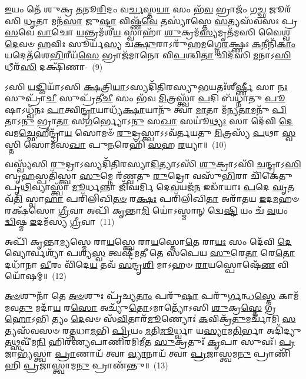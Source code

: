\-\ul{𑌇}\-𑌯𑌂 𑌤𑍇᳴ 𑌶𑍁𑌕𑍍𑌰 \ul{𑌤}\-𑌨𑍂\-\ul{𑌰𑌿}\-𑌦𑌂 𑌵\-\ul{𑌰𑍍𑌚}\-𑌸𑍍𑌤\-\ul{𑌯𑌾} 𑌸𑌂 𑌭᳴\-\ul{𑌵} 𑌭𑍍𑌰𑌾𑌜𑌂᳴ 𑌗\-\ul{𑌚𑍍𑌛} 𑌜𑍂𑌰᳴𑌸𑌿 \ul{𑌧𑍃}\-𑌤𑌾 𑌮𑌨᳴\-\ul{𑌸𑌾} 𑌜𑍁\-\ul{𑌷𑍍𑌟𑌾} 𑌵𑌿𑌷𑍍𑌣᳴\-\ul{𑌵𑍇} 𑌤𑌸𑍍𑌯𑌾॑𑌸𑍍𑌤𑍇 \ul{𑌸}\-𑌤𑍍𑌯𑌸᳴𑌵𑌸𑌃 𑌪𑍍𑌰\-\ul{𑌸}\-𑌵𑍇 \ul{𑌵𑌾}\-𑌚𑍋 \ul{𑌯}\-𑌨𑍍𑌤𑍍𑌰𑌮᳴𑌶𑍀\-\ul{𑌯} 𑌸𑍍𑌵𑌾𑌹𑌾᳴ \ul{𑌶𑍁}\-𑌕𑍍𑌰𑌮᳴\-\ul{𑌸𑍍𑌯}\-𑌮𑍃𑌤᳴𑌮𑌸𑌿 𑌵𑍈𑌶𑍍𑌵\-\ul{𑌦𑍇}\-𑌵𑍞 \ul{𑌹}\-𑌵𑌿𑌃 𑌸𑍂𑌰𑍍𑌯᳴\-\ul{𑌸𑍍𑌯} 𑌚\-\ul{𑌕𑍍𑌷𑍁}\-𑌰𑌾\-𑌽𑌰𑍁᳴𑌹\-\ul{𑌮}\-𑌗𑍍𑌨𑍇\-\ul{𑌰}\-𑌕𑍍𑌷𑍍𑌣𑌃 \ul{𑌕}\-𑌨𑍀𑌨𑌿᳴\-\ul{𑌕𑌾𑌂} 𑌯𑌦𑍇𑌤᳴𑌶𑍇\-\ul{𑌭𑌿}\-𑌰𑍀𑌯᳴\-\ul{𑌸𑍇} 𑌭𑍍𑌰𑌾𑌜᳴𑌮𑌾𑌨𑍋 𑌵𑌿\-\ul{𑌪}\-𑌶𑍍𑌚𑌿\-\ul{𑌤𑌾} 𑌚𑌿𑌦᳴𑌸𑌿 \ul{𑌮}\-𑌨𑌾\-𑌽\-\ul{𑌸𑌿} 𑌧𑍀𑌰᳴\-\ul{𑌸𑌿} 𑌦𑌕𑍍𑌷𑌿᳴𑌣𑌾-~(9)

𑌽𑌸𑌿 \ul{𑌯}\-𑌜𑍍𑌞𑌿𑌯𑌾᳴\-𑌽𑌸𑌿 \ul{𑌕𑍍𑌷}\-𑌤𑍍𑌰𑌿\-\ul{𑌯𑌾}\-\-𑌽𑌸𑍍𑌯𑌦𑌿᳴𑌤𑌿𑌰𑌸𑍍𑌯𑍁\-\ul{𑌭}\-𑌯𑌤𑌃᳴𑌶𑍀\-\ul{𑌰𑍍𑌷𑍍𑌣𑍀} 𑌸𑌾 \ul{𑌨𑌃} 𑌸𑍁𑌪𑍍𑌰𑌾᳴\-\ul{𑌚𑍀} 𑌸𑍁𑌪𑍍𑌰᳴𑌤𑍀\-\ul{𑌚𑍀} 𑌸𑌂 𑌭᳴𑌵 \ul{𑌮𑌿}\-𑌤𑍍𑌰𑌸𑍍𑌤𑍍𑌵𑌾᳴ \ul{𑌪}\-𑌦𑌿 𑌬᳴𑌧𑍍𑌨𑌾𑌤𑍁 \ul{𑌪𑍂}\-𑌷𑌾\-𑌽𑌧𑍍𑌵᳴𑌨𑌃 \ul{𑌪𑌾}\-𑌤𑍍𑌵𑌿\-\ul{𑌨𑍍𑌦𑍍𑌰𑌾}\-𑌯𑌾𑌧𑍍𑌯᳴\-\ul{𑌕𑍍𑌷𑌾}\-𑌯𑌾𑌨𑍁᳴ 𑌤𑍍𑌵𑌾 \ul{𑌮𑌾}\-𑌤𑌾 𑌮᳴𑌨𑍍𑌯\-\ul{𑌤𑌾}\-𑌮𑌨𑍁᳴ \ul{𑌪𑌿}\-𑌤𑌾\-𑌽\-\ul{𑌨𑍁} 𑌭𑍍𑌰𑌾\-\ul{𑌤𑌾} 𑌸\-\ul{𑌗}\-𑌰𑍍𑌭𑍍𑌯𑍋\-𑌽\-\ul{𑌨𑍁} 𑌸\-\ul{𑌖𑌾} 𑌸𑌯𑍂॑\-\ul{𑌥𑍍𑌯𑌃} 𑌸𑌾 𑌦𑍇᳴𑌵𑌿 \ul{𑌦𑍇}\-𑌵𑌮\-\ul{𑌚𑍍𑌛𑍇}\-𑌹𑍀𑌨𑍍𑌦𑍍𑌰𑌾᳴\-\ul{𑌯} 𑌸𑍋𑌮𑍞᳴ \ul{𑌰𑍁}\-𑌦𑍍𑌰𑌸𑍍𑌤𑍍𑌵𑌾\-𑌽\-𑌽𑌵᳴𑌰𑍍𑌤𑌯𑌤𑍁 \ul{𑌮𑌿}\-𑌤𑍍𑌰𑌸𑍍𑌯᳴ \ul{𑌪}\-𑌥𑌾 \ul{𑌸𑍍𑌵}\-𑌸𑍍𑌤𑌿 𑌸𑍋𑌮᳴𑌸\-\ul{𑌖𑌾} 𑌪𑍁\-\ul{𑌨}\-𑌰𑍇𑌹𑌿᳴ \ul{𑌸}\-𑌹 \ul{𑌰}\-𑌯𑍍𑌯𑌾॥~(10)

{\anuvakamend[{𑌦𑌕𑍍𑌷𑌿᳴\-\ul{𑌣𑌾} 𑌸𑍋𑌮᳴𑌸\-\ul{𑌖𑌾} 𑌪𑌞𑍍𑌚᳴ 𑌚}]}%

𑌵𑌸𑍍𑌵𑍍𑌯᳴𑌸𑌿 \ul{𑌰𑍁}\-𑌦𑍍𑌰𑌾\-𑌽𑌸𑍍𑌯𑌦𑌿᳴𑌤𑌿𑌰𑌸𑍍𑌯𑌾\-\ul{𑌦𑌿}\-𑌤𑍍𑌯𑌾\-𑌽𑌸𑌿᳴ \ul{𑌶𑍁}\-𑌕𑍍𑌰𑌾\-𑌽𑌸𑌿᳴ \ul{𑌚}\-𑌨𑍍𑌦𑍍𑌰𑌾\-𑌽\-\ul{𑌸𑌿} 𑌬𑍃\-\ul{𑌹}\-𑌸𑍍𑌪𑌤𑌿᳴𑌸𑍍𑌤𑍍𑌵𑌾 \ul{𑌸𑍁}\-𑌮𑍍𑌨𑍇 𑌰᳴𑌣𑍍𑌵𑌤𑍁 \ul{𑌰𑍁}\-𑌦𑍍𑌰𑍋 𑌵𑌸𑍁᳴\-\ul{𑌭𑌿}\-𑌰𑌾 𑌚𑌿᳴𑌕𑍇𑌤𑍁 𑌪𑍃\-\ul{𑌥𑌿}\-𑌵𑍍𑌯𑌾𑌸𑍍𑌤𑍍𑌵𑌾᳴ \ul{𑌮𑍂}\-𑌰𑍍𑌧𑌨𑍍𑌨𑌾 𑌜𑌿᳴𑌘𑌰𑍍𑌮𑌿 𑌦𑍇\-\ul{𑌵}\-𑌯𑌜᳴\-\ul{𑌨} 𑌇𑌡𑌾᳴𑌯𑌾𑌃 \ul{𑌪}\-𑌦𑍇 \ul{𑌘𑍃}\-𑌤𑌵᳴\-\ul{𑌤𑌿} 𑌸𑍍𑌵𑌾\-\ul{𑌹𑌾} 𑌪𑌰𑌿᳴𑌲𑌿𑌖𑌿\-\ul{𑌤}\-\-\ul{𑍞} 𑌰\-\ul{𑌕𑍍𑌷𑌃} 𑌪𑌰𑌿᳴𑌲𑌿𑌖𑌿\-\ul{𑌤𑌾} 𑌅𑌰𑌾᳴𑌤𑌯 \ul{𑌇}\-𑌦\-\ul{𑌮}\-𑌹𑍞 𑌰𑌕𑍍𑌷᳴𑌸𑍋 \ul{𑌗𑍍𑌰𑍀}\-𑌵𑌾 𑌅𑌪𑌿᳴ 𑌕𑍃𑌨𑍍𑌤𑌾\-\ul{𑌮𑌿} 𑌯𑍋॑\-𑌽𑌸𑍍𑌮𑌾𑌨𑍍 𑌦𑍍𑌵𑍇\-\ul{𑌷𑍍𑌟𑌿} 𑌯𑌂 𑌚᳴ \ul{𑌵}\-𑌯𑌂 \ul{𑌦𑍍𑌵𑌿}\-𑌷𑍍𑌮 \ul{𑌇}\-𑌦𑌮᳴𑌸𑍍𑌯 \ul{𑌗𑍍𑌰𑍀}\-𑌵𑌾~(11)

𑌅𑌪𑌿᳴ 𑌕𑍃𑌨𑍍𑌤𑌾\-\ul{𑌮𑍍𑌯}\-𑌸𑍍𑌮𑍇 𑌰𑌾\-\ul{𑌯}\-𑌸𑍍𑌤𑍍𑌵𑍇 𑌰𑌾\-\ul{𑌯}\-𑌸𑍍𑌤𑍋\-\ul{𑌤𑍇} 𑌰𑌾\-\ul{𑌯𑌃} 𑌸𑌂 𑌦𑍇᳴𑌵𑌿 \ul{𑌦𑍇}\-𑌵𑍍𑌯𑍋𑌰𑍍𑌵𑌶𑍍𑌯𑌾᳴ 𑌪𑌶𑍍𑌯\-\ul{𑌸𑍍𑌵} 𑌤𑍍𑌵𑌷𑍍𑌟𑍀᳴𑌮𑌤𑍀 𑌤𑍇 𑌸𑌪𑍇𑌯 \ul{𑌸𑍁}\-𑌰𑍇\-\ul{𑌤𑌾} 𑌰𑍇\-\ul{𑌤𑍋} 𑌦𑌧𑌾᳴𑌨𑌾 \ul{𑌵𑍀}\-𑌰𑌂 𑌵𑌿᳴𑌦𑍇\-\ul{𑌯} 𑌤𑌵᳴ \ul{𑌸}\-𑌨𑍍𑌦𑍃\-\ul{𑌶𑌿} 𑌮𑌾\-𑌽𑌹𑍞 \ul{𑌰𑌾}\-𑌯𑌸𑍍𑌪𑍋𑌷𑍇᳴\-\ul{𑌣} 𑌵𑌿 𑌯𑍋᳴𑌷𑌮𑍍॥~(12)

{\anuvakamend[{\-\ul{𑌅}\-\-\ul{𑌸𑍍𑌯} \ul{𑌗𑍍𑌰𑍀}\-𑌵𑌾 𑌏\-\ul{𑌕𑌾}\-𑌨𑍍𑌨\-\ul{𑌤𑍍𑌰𑌿}\-\-\ul{𑍞}\-𑌶𑌚𑍍𑌚᳴}]}%

\-\ul{𑌅}\-\-\ul{𑍞}\-𑌶𑍁𑌨𑌾᳴ 𑌤𑍇 \ul{𑌅}\-\-\ul{𑍞}\-𑌶𑍁𑌃 𑌪𑍃᳴𑌚𑍍𑌯\-\ul{𑌤𑌾𑌂} 𑌪𑌰𑍁᳴\-\ul{𑌷𑌾} 𑌪𑌰𑍁᳴\-\ul{𑌰𑍍𑌗}\-𑌨𑍍𑌧\-\ul{𑌸𑍍𑌤𑍇} 𑌕𑌾𑌮᳴𑌮𑌵\-\ul{𑌤𑍁} 𑌮𑌦𑌾᳴\-\ul{𑌯} 𑌰\-\ul{𑌸𑍋} 𑌅𑌚𑍍𑌯𑍁᳴\-\ul{𑌤𑍋}\-\-𑌽𑌮𑌾𑌤𑍍𑌯𑍋᳴\-𑌽𑌸𑌿 \ul{𑌶𑍁}\-𑌕𑍍𑌰\-\ul{𑌸𑍍𑌤𑍇} 𑌗𑍍𑌰\-\ul{𑌹𑍋}\-\-𑌽𑌭𑌿 𑌤𑍍𑌯𑌂 \ul{𑌦𑍇}\-𑌵𑍞 𑌸᳴\-\ul{𑌵𑌿}\-𑌤𑌾𑌰᳴\-\ul{𑌮𑍂}\-𑌣𑍍𑌯𑍋𑌃॑ \ul{𑌕}\-𑌵𑌿𑌕𑍍𑌰᳴\-\ul{𑌤𑍁}\-𑌮𑌰𑍍𑌚𑌾᳴𑌮𑌿 \ul{𑌸}\-𑌤𑍍𑌯𑌸᳴𑌵𑌸𑍞 𑌰\-\ul{𑌤𑍍𑌨}\-𑌧𑌾\-\ul{𑌮}\-𑌭𑌿 \ul{𑌪𑍍𑌰𑌿}\-𑌯𑌂 \ul{𑌮}\-𑌤𑌿\-\ul{𑌮𑍂}\-𑌰𑍍𑌧𑍍𑌵𑌾 𑌯\-\ul{𑌸𑍍𑌯𑌾}\-𑌮\-\ul{𑌤𑌿}\-𑌰𑍍𑌭𑌾 𑌅𑌦𑌿᳴𑌦𑍍𑌯𑍁\-\ul{𑌤}\-𑌥𑍍𑌸𑌵𑍀᳴𑌮\-\ul{𑌨𑌿} 𑌹𑌿𑌰᳴𑌣𑍍𑌯𑌪𑌾𑌣𑌿𑌰𑌮𑌿𑌮𑍀𑌤 \ul{𑌸𑍁}\-𑌕𑍍𑌰𑌤𑍁𑌃᳴ \ul{𑌕𑍃}\-𑌪𑌾 𑌸𑍁𑌵𑌃᳴। \ul{𑌪𑍍𑌰}\-𑌜𑌾𑌭𑍍𑌯᳴𑌸𑍍𑌤𑍍𑌵𑌾 \ul{𑌪𑍍𑌰𑌾}\-𑌣𑌾𑌯᳴ 𑌤𑍍𑌵𑌾 \ul{𑌵𑍍𑌯𑌾}\-𑌨𑌾𑌯᳴ 𑌤𑍍𑌵𑌾 \ul{𑌪𑍍𑌰}\-𑌜𑌾𑌸𑍍𑌤𑍍𑌵𑌮\-\ul{𑌨𑍁} 𑌪𑍍𑌰𑌾𑌣𑌿᳴𑌹𑌿 \ul{𑌪𑍍𑌰}\-𑌜𑌾𑌸𑍍𑌤𑍍𑌵𑌾𑌮\-\ul{𑌨𑍁} 𑌪𑍍𑌰𑌾𑌣᳴𑌨𑍍𑌤𑍁॥~(13)

